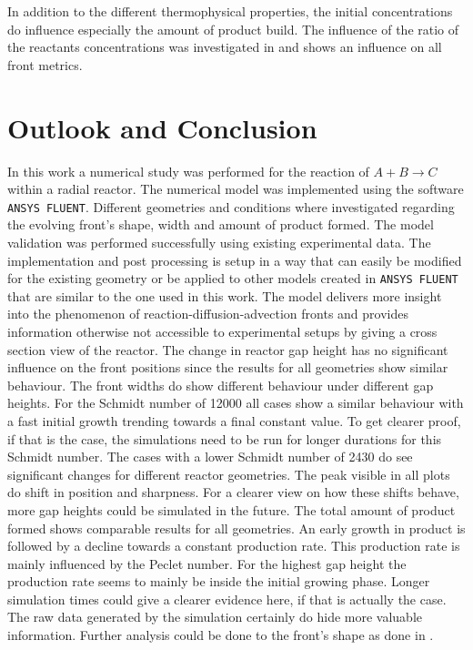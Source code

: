 \documentclass[../thesis.tex]{subfiles}
\begin{document}
In addition to the different thermophysical properties, the initial concentrations do influence especially the amount of product build. The influence of the ratio of the reactants concentrations was investigated in \cite{comolli2021dynamics} and shows an influence on all front metrics.


\chapter{Outlook and Conclusion}
\label{chp:out_con}
In this work a numerical study was performed for the reaction of $A +B \rightarrow C$ within a radial reactor. The numerical model was implemented using the software \texttt{ANSYS FLUENT}. Different geometries and conditions where investigated regarding the evolving front's shape, width and amount of product formed. The model validation was performed successfully using existing experimental data.
The implementation and post processing is setup in a way that can easily be modified for the existing geometry or be applied to other models created in \texttt{ANSYS FLUENT} that are similar to the one used in this work. The model delivers more insight into the phenomenon of reaction-diffusion-advection fronts and provides information otherwise not accessible to experimental setups by giving a cross section view of the reactor.
The change in reactor gap height has no significant influence on the front positions since the results for all geometries show similar behaviour. The front widths do show different behaviour under different gap heights. For the Schmidt number of 12000 all cases show a similar behaviour with a fast initial growth trending towards a final constant value. To get clearer proof, if that is the case, the simulations need to be run for longer durations for this Schmidt number. The cases with a lower Schmidt number of 2430 do see significant changes for different reactor geometries. The peak visible in all plots do shift in position and sharpness. For a clearer view on how these shifts behave, more gap heights could be simulated in the future. The total amount of product formed shows comparable results for all geometries. An early growth in product is followed by a decline towards a constant production rate. This production rate is mainly influenced by the Peclet number. For the highest gap height the production rate seems to mainly be inside the initial growing phase. Longer simulation times could give a clearer evidence here, if that is actually the case.
The raw data generated by the simulation certainly do hide more valuable information. Further analysis could be done to the front's shape as done in \cite{perez2019upscaling, villermaux2012mixing}. 
\end{document}
